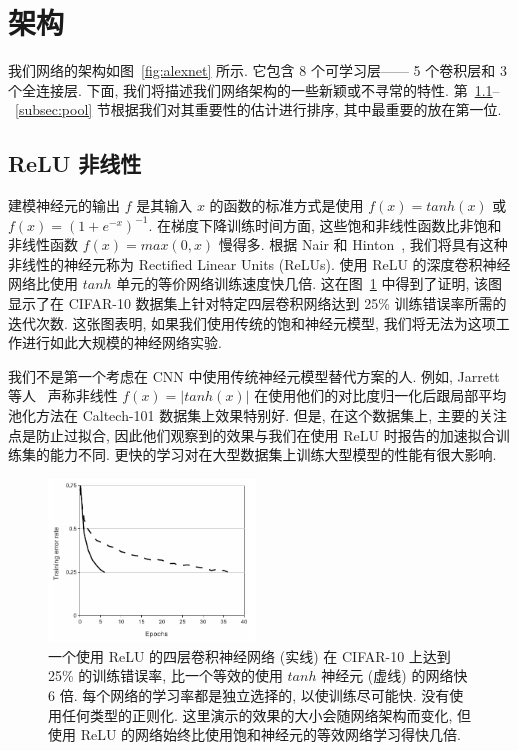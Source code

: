 \documentclass{article} %
\begin{document}
\vspace{-1mm}
\section{架构}
\label{sec:arch}
\vspace{-2ex}
我们网络的架构如图~\ref{fig:alexnet} 所示. 它包含 8 个可学习层—— 5 个卷积层和 3 个全连接层. 下面, 我们将描述我们网络架构的一些新颖或不寻常的特性. 第~\ref{subsec:relu}--~\ref{subsec:pool} 节根据我们对其重要性的估计进行排序, 其中最重要的放在第一位.

\vspace{-1mm}
\subsection{ReLU 非线性}
\label{subsec:relu}
\vspace{-2ex}
建模神经元的输出 $f$ 是其输入 $x$ 的函数的标准方式是使用 $f(x) = tanh(x)$ 或 $f(x) = (1 + e^{-x})^{-1}$. 在梯度下降训练时间方面, 这些饱和非线性函数比非饱和非线性函数 $f(x) = max(0, x)$ 慢得多. 根据 Nair 和 Hinton~\cite{nair2010}, 我们将具有这种非线性的神经元称为 Rectified Linear Units (ReLUs). 使用 ReLU 的深度卷积神经网络比使用 $tanh$ 单元的等价网络训练速度快几倍. 这在图~\ref{fig:relu} 中得到了证明, 该图显示了在 CIFAR-10 数据集上针对特定四层卷积网络达到 25\% 训练错误率所需的迭代次数. 这张图表明, 如果我们使用传统的饱和神经元模型, 我们将无法为这项工作进行如此大规模的神经网络实验.

我们不是第一个考虑在 CNN 中使用传统神经元模型替代方案的人. 例如, Jarrett 等人~\cite{jarrett2009} 声称非线性 $f(x) = |tanh(x)|$ 在使用他们的对比度归一化后跟局部平均池化方法在 Caltech-101 数据集上效果特别好. 但是, 在这个数据集上, 主要的关注点是防止过拟合, 因此他们观察到的效果与我们在使用 ReLU 时报告的加速拟合训练集的能力不同. 更快的学习对在大型数据集上训练大型模型的性能有很大影响.

\begin{figure}
\centering
\includegraphics[width=0.49\textwidth]{relu.png}

\caption{一个使用 ReLU 的四层卷积神经网络 (实线) 在 CIFAR-10 上达到 25\% 的训练错误率, 比一个等效的使用 $tanh$ 神经元 (虚线) 的网络快 6 倍. 每个网络的学习率都是独立选择的, 以使训练尽可能快. 没有使用任何类型的正则化. 这里演示的效果的大小会随网络架构而变化, 但使用 ReLU 的网络始终比使用饱和神经元的等效网络学习得快几倍.}
\label{fig:relu}
\end{figure}
\end{document}
